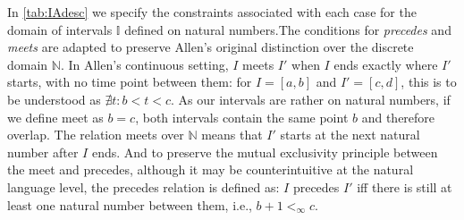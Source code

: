 In \ref{tab:IAdesc} we specify the constraints associated with each case for the domain of intervals $\mathbb{I}$ defined on natural numbers.The conditions for \emph{precedes} and \emph{meets} are adapted to preserve Allen's original distinction over the discrete domain $\mathbb{N}$. In Allen's continuous setting, $I$ meets $I'$ when $I$ ends exactly where $I'$ starts, with no time point between them: for $I=[a,b]$ and $I'=[c,d]$, this is to be understood as $\nexists t: b < t < c$. As our intervals are rather on natural numbers,  if we define meet as $b=c$, both intervals contain the same point $b$ and therefore overlap. The relation meets over $\mathbb{N}$ means that $I'$ starts at the next natural number after $I$ ends.  And to preserve the mutual exclusivity principle between the meet and precedes, although it may be counterintuitive at the natural language level, the precedes relation is defined as: $I$ precedes $I'$ iff there is still at least one natural number between them, i.e., $b+1 <_\infty c$.

